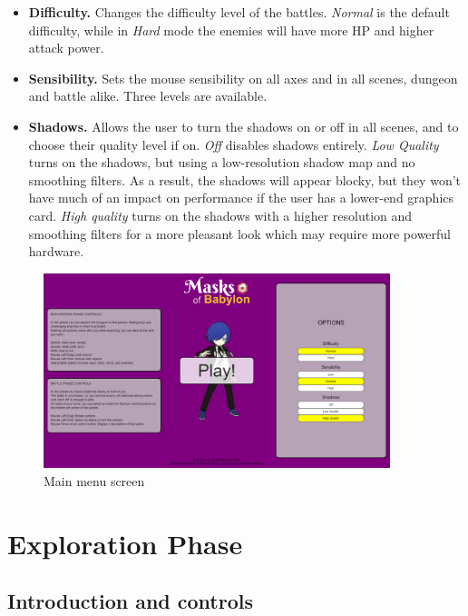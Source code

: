 \begin{itemize}
    \item \textbf{Difficulty.} Changes the difficulty level of the battles. \textit{Normal} is the default difficulty, while in \textit{Hard} mode the enemies will have more HP and higher attack power.
    \item \textbf{Sensibility.} Sets the mouse sensibility on all axes and in all scenes, dungeon and battle alike. Three levels are available.
    \item \textbf{Shadows.} Allows the user to turn the shadows on or off in all scenes, and to choose their quality level if on. \textit{Off} disables shadows entirely. \textit{Low Quality} turns on the shadows, but using a low-resolution shadow map and no smoothing filters. As a result, the shadows will appear blocky, but they won't have much of an impact on performance if the user has a lower-end graphics card. \textit{High quality} turns on the shadows with a higher resolution and smoothing filters for a more pleasant look which may require more powerful hardware.
\end{itemize}

\begin{figure}[H]
    \centering
    \includegraphics[width=0.9\textwidth]{images/ch2/main-menu.png}
    \caption{Main menu screen}
    \label{fig:main-menu}
\end{figure}

\section{Exploration Phase}

\subsection{Introduction and controls}
\label{sub:exploration-controls}

